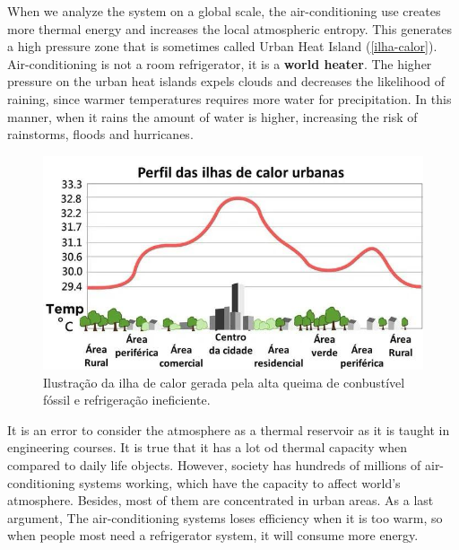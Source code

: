 When we analyze the system on a global scale, the air-conditioning use creates more thermal energy and increases the local atmospheric entropy. This generates a high pressure zone that is sometimes called Urban Heat Island (\autoref{ilha-calor}). Air-conditioning is not a room refrigerator, it is a \textbf{world heater}. The higher pressure on the urban heat islands expels clouds and decreases the likelihood of raining, since warmer temperatures requires more water for precipitation. In this manner, when it rains the amount of water is higher, increasing the risk of rainstorms, floods and hurricanes.

\begin{figure}[ht]
    \centering
    \includegraphics[scale=0.6]{pictures/ilha-calor.jpg}
    \caption{Ilustração da ilha de calor gerada pela alta queima de conbustível fóssil e refrigeração ineficiente.}
    \label{ilha-calor}
\end{figure}

It is an error to consider the atmosphere as a thermal reservoir as it is taught in engineering courses. It is true that it has a lot od thermal capacity when compared to daily life objects. However, society has hundreds of millions of air-conditioning systems working, which have the capacity to affect world's atmosphere. Besides, most of them are concentrated in urban areas. 
As a last argument, The air-conditioning systems loses efficiency when it is too warm, so when people most need a refrigerator system, it will consume more energy. 